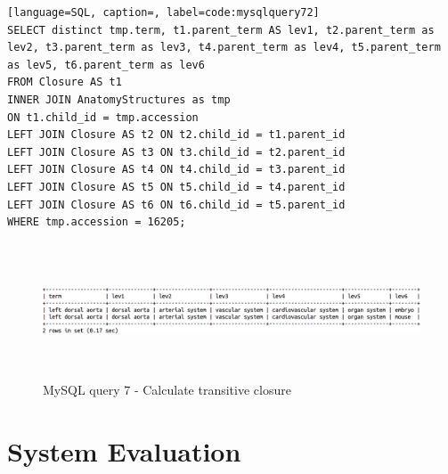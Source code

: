 \begin{lstlisting}[language=SQL, caption=, label=code:mysqlquery72]
SELECT distinct tmp.term, t1.parent_term AS lev1, t2.parent_term as lev2, t3.parent_term as lev3, t4.parent_term as lev4, t5.parent_term as lev5, t6.parent_term as lev6
FROM Closure AS t1
INNER JOIN AnatomyStructures as tmp
ON t1.child_id = tmp.accession
LEFT JOIN Closure AS t2 ON t2.child_id = t1.parent_id
LEFT JOIN Closure AS t3 ON t3.child_id = t2.parent_id
LEFT JOIN Closure AS t4 ON t4.child_id = t3.parent_id
LEFT JOIN Closure AS t5 ON t5.child_id = t4.parent_id
LEFT JOIN Closure AS t6 ON t6.child_id = t5.parent_id
WHERE tmp.accession = 16205;
\end{lstlisting}
\begin{figure}[H]\begin{center}\includegraphics[height=4cm,width=1\linewidth]{images/mysqlquery72}\caption{MySQL query 7 - Calculate transitive closure}\label{fig:mysqlquery7}\end{center}\end{figure}


\section{System Evaluation}\label{queryevaluation}